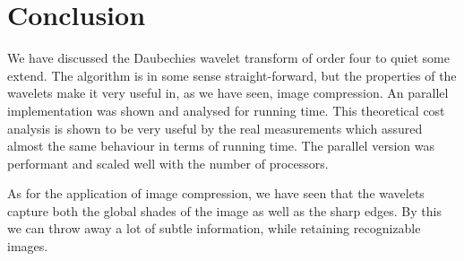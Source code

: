
\section{Conclusion}
\label{sec:conc}

We have discussed the Daubechies wavelet transform of order four to quiet some extend. The algorithm is in some sense straight-forward, but the properties of the wavelets make it very useful in, as we have seen, image compression. An parallel implementation was shown and analysed for running time. This theoretical cost analysis is shown to be very useful by the real measurements which assured almost the same behaviour in terms of running time. The parallel version was performant and scaled well with the number of processors.

As for the application of image compression, we have seen that the wavelets capture both the global shades of the image as well as the sharp edges. By this we can throw away a lot of subtle information, while retaining recognizable images.

